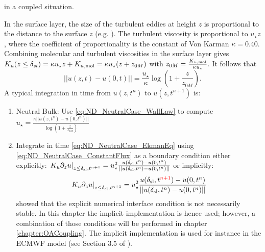in a coupled situation.
%
\par
In the surface layer, the size of the turbulent eddies at height $z$
is proportional to the distance to the surface $z$
(e.g. \cite{kawai_wall-modeling_2012}). The turbulent viscosity
is proportional to $u_\star z$, where the coefficient of
proportionality is the constant of Von Karman $\kappa = 0.40$.
Combining molecular and turbulent viscosities in the surface layer
gives $K_u(z\leq \delta_{sl}) = \kappa u_\star z + K_{u, {\rm mol}}
= \kappa u_\star (z + z_{0M})$ with $z_{0M} = \frac{K_{u, {\rm mol}}}{\kappa u_\star}$.
It follows that
\begin{equation}
\label{eq:ND_NeutralCase_WallLaw}
	||u(z, t) - u(0, t)|| = \frac{{u_\star}}{\kappa}
	\log(1+\frac{z}{z_{0M}}).
\end{equation}
A typical integration in time from $u(z, t^{n})$ to
$u(z, t^{n+1})$ is:
\begin{enumerate}
	\item Neutral Bulk: Use \eqref{eq:ND_NeutralCase_WallLaw}
	  to compute $u_\star = \frac{\kappa ||u(z, t^n)-u(0, t^n)||}
			{\log(1+\frac{z}{z_{0M}})}$
  \item Integrate in time \eqref{eq:ND_NeutralCase_EkmanEq}
  using \eqref{eq:ND_NeutralCase_ConstantFlux} as a boundary condition
		either explicitly: $\left.K_u \partial_z u
		\right|_{z\leq \delta_{\rm sl}, t^{n+1}}
		= u_\star^2 \frac{u(\delta_{\rm sl}, t^n)-u(0,t^n)}
		{||u(\delta_{\rm sl}, t^n)-u(0,t^n)||}$
		or implicitly:
	\begin{equation}
		\left.K_u \partial_z u
		\right|_{z\leq \delta_{\rm sl}, t^{n+1}}
		= u_\star^2 \frac{u(\delta_{\rm sl},
		t^{\color{red} n+1})-u(0,t^n)}
		{||u(\delta_{\rm sl}, t^n)-u(0,t^n)||}
	\end{equation}
	\cite{lemarie_stability_2015} showed that the explicit
	numerical interface condition is not necessarily
	stable.
	In this chapter the implicit implementation is hence used;
	however, a combination of those conditions
	will be performed in chapter \ref{chapter:OACoupling}.
	The implicit implementation is used for instance in the
	ECMWF model (see Section 3.5 of \citep{ecmwf_ifs_2020}).
\end{enumerate}


